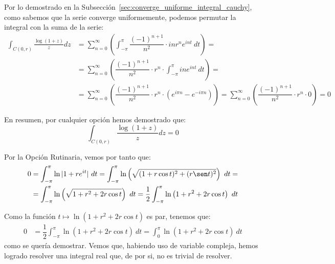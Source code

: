\begin{ejercicio}
\begin{description}
        Por lo demostrado en la Subsección~\ref{sec:converge_uniforme_integral_cauchy}, como sabemos que la serie converge uniformemente, podemos permutar la integral con la suma de la serie:
        \begin{align*}
            \int_{C(0,r)} \frac{\log(1+z)}{z}dz &= \sum\limits_{n=0}^\infty\left(\int_{-\pi}^{\pi} \dfrac{(-1)^{n+1}}{n^2}\cdot inr^ne^{int}\ dt\right)
            =\\&= \sum\limits_{n=0}^\infty\left(\dfrac{(-1)^{n+1}}{n^2}\cdot r^n\cdot \int_{-\pi}^{\pi} ine^{int}\ dt\right)
            =\\&= \sum\limits_{n=0}^\infty\left(\dfrac{(-1)^{n+1}}{n^2}\cdot r^n\cdot \left(e^{i\pi n}-e^{-i\pi n}\right)\right)
            = \sum\limits_{n=0}^\infty\left(\dfrac{(-1)^{n+1}}{n^2}\cdot r^n\cdot 0\right)=0
        \end{align*}

        
    \end{description}

    En resumen, por cualquier opción hemos demostrado que:
    \begin{equation*}
        \int_{C(0,r)} \frac{\log(1+z)}{z}dz = 0
    \end{equation*}

    Por la Opción Rutinaria, vemos por tanto que:
    \begin{align*}
        0&= \int_{-\pi}^{\pi} \ln|1+re^{it}|\ dt
        = \int_{-\pi}^{\pi} \ln\left(\sqrt{(1+r\cos t)^2+(r\sen t)^2}\right)\ dt
        =\\&= \int_{-\pi}^{\pi} \ln\left(\sqrt{1+r^2+2r\cos t}\right)\ dt
        = \dfrac{1}{2}\int_{-\pi}^{\pi} \ln\left(1+r^2+2r\cos t\right)\ dt
    \end{align*}

    Como la función $t\mapsto \ln\left(1+r^2+2r\cos t\right)$ es par, tenemos que:
    \begin{align*}
        0&= \dfrac{1}{2}\int_{-\pi}^{\pi} \ln\left(1+r^2+2r\cos t\right)\ dt
        = \int_{0}^{\pi} \ln\left(1+r^2+2r\cos t\right)\ dt
    \end{align*}
    como se quería demostrar. Vemos que, habiendo uso de variable compleja, hemos logrado resolver una integral real que, de por si, no es trivial de resolver.
\end{ejercicio}

